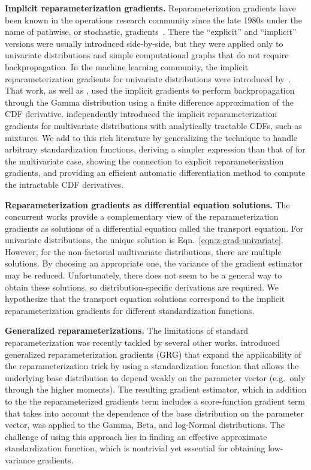 \documentclass{article}
\newcommand{\eg}{e.g.~}
\begin{document}
\textbf{Implicit reparameterization gradients.}
Reparameterization gradients have been known in the operations research community since the late 1980s under the name of pathwise, or stochastic, gradients~\citep{suri1988perturbation,fu2006gradient}.
There the ``explicit'' and ``implicit'' versions were usually introduced side-by-side, but they were applied only to univariate distributions and simple computational graphs that do not require backpropagation.
In the machine learning community, the implicit reparameterization gradients for univariate distributions were introduced by~\citet{salimans2013fixed}.
That work, as well as \citet{hoffman2015stochastic}, used the implicit gradients to perform backpropagation through the Gamma distribution using a finite difference approximation of the CDF derivative.
\citet{graves2016stochastic} independently introduced the implicit reparameterization gradients for multivariate distributions with analytically tractable CDFs, such as mixtures. We add to this rich literature by generalizing the technique to handle arbitrary standardization functions, deriving a simpler expression than that of \citet{graves2016stochastic} for the multivariate case, showing the connection to explicit reparameterization gradients, and providing an efficient automatic differentiation method to compute the intractable CDF derivatives.

\textbf{Reparameterization gradients as differential equation solutions.}
The concurrent works \citep{jankowiak2018pathwisebeyond,jankowiak2018pathwisemultivariate} provide a complementary view of the reparameterization gradients as solutions of a differential equation called the transport equation.
For univariate distributions, the unique solution is Eqn.~\eqref{eqn:z-grad-univariate}.
However, for the non-factorial multivariate distributions, there are multiple solutions.
By choosing an appropriate one, the variance of the gradient estimator may be reduced.
Unfortunately, there does not seem to be a general way to obtain these solutions, so distribution-specific derivations are required.
We hypothesize that the transport equation solutions correspond to the implicit reparameterization gradients for different standardization functions.

\textbf{Generalized reparameterizations.}
The limitations of standard reparameterization was recently tackled by several other works. 
\citet{ruiz2016generalized} introduced generalized reparameterization gradients (GRG) that expand the applicability of the reparameterization trick by using a standardization function that allows the underlying base distribution to depend weakly on the parameter vector (\eg only through the higher moments). The resulting gradient estimator, which in addition to the the reparameterized gradients term includes a score-function gradient term that takes into account the dependence of the base distribution on the parameter vector, was applied to the Gamma, Beta, and log-Normal distributions. The challenge of using this approach lies in finding an effective approximate standardization function, which is nontrivial yet essential for obtaining low-variance gradients.
\end{document}
